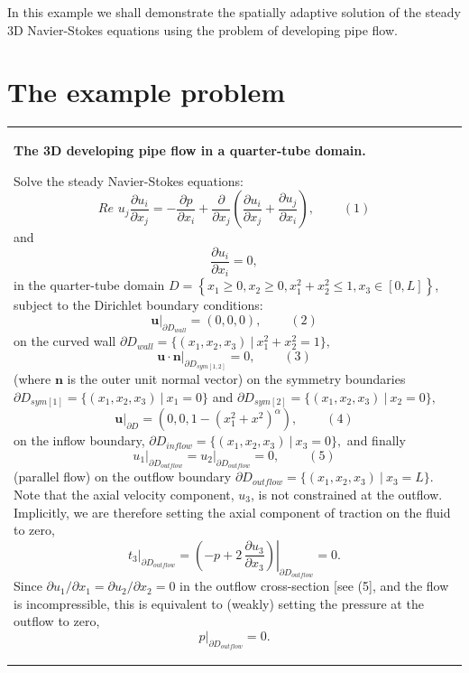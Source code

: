 In this example we shall demonstrate the spatially adaptive solution of the steady 3D Navier-\/\+Stokes equations using the problem of developing pipe flow.



 

\hypertarget{index_example}{}\section{The example problem}\label{index_example}
\begin{center} \tabulinesep=1mm
\begin{longtabu} spread 0pt [c]{*{1}{|X[-1]}|}
\hline
\begin{center} {\bfseries The 3D developing pipe flow in a quarter-\/tube domain.} \end{center}  Solve the steady Navier-\/\+Stokes equations\+: \[ Re\phantom{i}u_j\frac{\partial u_i}{\partial x_j} = - \frac{\partial p}{\partial x_i} + \frac{\partial }{\partial x_j} \left( \frac{\partial u_i}{\partial x_j} + \frac{\partial u_j}{\partial x_i} \right), \ \ \ \ \ \ \ \ \ \ (1) \] and \[ \frac{\partial u_i}{\partial x_i} = 0, \] in the quarter-\/tube domain $ D = \left\{x_1 \geq 0, x_2 \geq 0, x_1^2+x_2^2 \leq 1, x_3 \in [0,L] \right\}$, subject to the Dirichlet boundary conditions\+: \[ \left. \mathbf{u}\right|_{\partial D_{wall}}=(0,0,0), \ \ \ \ \ \ \ \ \ \ (2) \] on the curved wall $ \partial D_{wall} = \{(x_1,x_2,x_3) \ | \ x_1^2+x_2^2=1\}, $ \[ \left. \mathbf{u}\cdot\mathbf{n}\right|_{\partial D_{sym[1,2]}}=0, \ \ \ \ \ \ \ \ \ \ (3) \] (where $ \mathbf{n} $ is the outer unit normal vector) on the symmetry boundaries $ \partial D_{sym[1]} = \{(x_1,x_2,x_3) \ | \ x_1=0\} $ and $ \partial D_{sym[2]} = \{(x_1,x_2,x_3) \ | \ x_2=0\}, $ \[ \left. \mathbf{u}\right|_{\partial D}=(0,0,1-(x_1^2+x^2)^\alpha), \ \ \ \ \ \ \ \ \ \ (4) \] on the inflow boundary, $ \partial D_{inflow} = \{(x_1,x_2,x_3) \ | \ x_3=0\}, $ and finally \[ \left. u_1\right|_{\partial D_{outflow}}= \left. u_2\right|_{\partial D_{outflow}}=0, \ \ \ \ \ \ \ \ \ \ (5) \] (parallel flow) on the outflow boundary $ \partial D_{outflow} = \{(x_1,x_2,x_3) \ | \ x_3=L\}.$ Note that the axial velocity component, $u_3$, is not constrained at the outflow. Implicitly, we are therefore setting the axial component of traction on the fluid to zero, \[ t_3|_{\partial D_{outflow}} = \left. \left(-p + 2 \, \frac{\partial u_3}{\partial x_3}\right) \right|_{\partial D_{outflow}} = 0. \] Since $ \partial u_1 / \partial x_1 = \partial u_2 /\partial x_2 = 0$ in the outflow cross-\/section \mbox{[}see (5\mbox{]}, and the flow is incompressible, this is equivalent to (weakly) setting the pressure at the outflow to zero, \[ p|_{\partial D_{outflow}}=0. \]   \\
\end{longtabu}
\end{center} 



